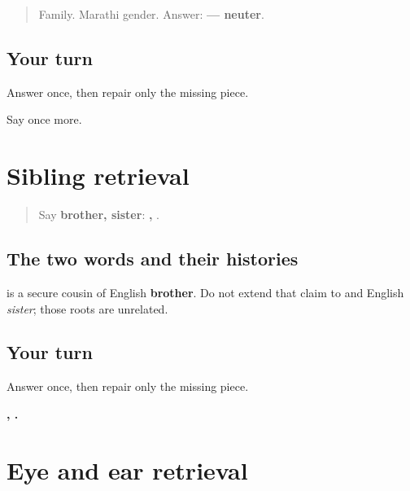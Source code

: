 \label{lesson:MR-R14-kutumb-r2}



\begin{quote}
Family. Marathi gender. Answer: \textbf{ — neuter}.
\end{quote}

\subsection*{Your turn}
Answer once, then repair only the missing piece.

\begin{tcolorbox}[breakable,colback=teal!4,colframe=teal!35!black,title={Before you move on}]
Say \textbf{} once more.
\end{tcolorbox}
\section[bhau / bahin]{Sibling retrieval}

\label{lesson:MR-R14-siblings}



\begin{quote}
Say \textbf{brother, sister}: \textbf{, }.
\end{quote}

\subsection*{The two words and their histories}
\textbf{} is a secure cousin of English \textbf{brother}. Do not extend that claim to \textbf{} and English \emph{sister}; those roots are unrelated.

\subsection*{Your turn}
Answer once, then repair only the missing piece.

\begin{tcolorbox}[breakable,colback=teal!4,colframe=teal!35!black,title={Before you move on}]
\textbf{, .}
\end{tcolorbox}
\section[dola / kaan]{Eye and ear retrieval}

\label{lesson:MR-R14-eye-ear}



